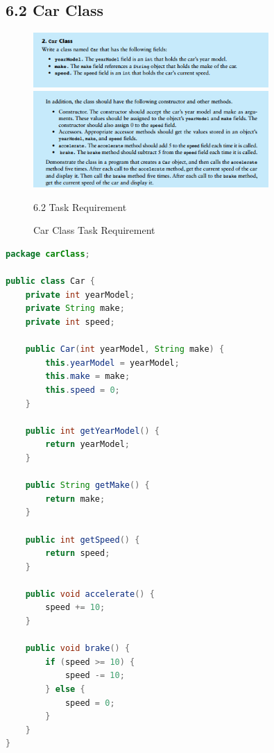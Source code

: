 \documentclass{article}
\begin{document}
\subsection*{6.2 Car Class}
\begin{figure}[H]
    \centering
    \includegraphics[width=0.8\textwidth]{./Assets/Task requirements/Assignment6/6.2.1.png}
    \includegraphics[width=0.8\textwidth]{./Assets/Task requirements/Assignment6/6.2.2.png}
    \caption{6.2 Task Requirement}
\end{figure}

\begin{figure}[h]
    \centering
    \caption{Car Class Task Requirement}
\end{figure}

\begin{lstlisting}[language=Java, caption=Car.java]
package carClass;

public class Car {
    private int yearModel;
    private String make;
    private int speed;

    public Car(int yearModel, String make) {
        this.yearModel = yearModel;
        this.make = make;
        this.speed = 0;
    }

    public int getYearModel() {
        return yearModel;
    }

    public String getMake() {
        return make;
    }

    public int getSpeed() {
        return speed;
    }

    public void accelerate() {
        speed += 10;
    }

    public void brake() {
        if (speed >= 10) {
            speed -= 10;
        } else {
            speed = 0;
        }
    }
}

\end{lstlisting}
\end{document}
